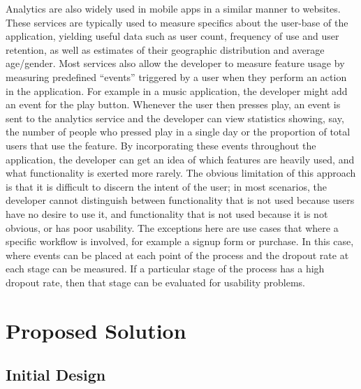 Analytics are also widely used in mobile apps in a similar manner to websites.
These services are typically used to measure specifics about the user-base of
the application, yielding useful data such as user count, frequency of use and
user retention, as well as estimates of their geographic distribution and
average age/gender. Most services also allow the developer to measure feature
usage by measuring predefined ``events'' triggered by a user when they perform
an action in the application. For example in a music application, the developer
might add an event for the play button. Whenever the user then presses play, an
event is sent to the analytics service and the developer can view statistics
showing, say, the number of people who pressed play in a single day or the
proportion of total users that use the feature. By incorporating these events
throughout the application, the developer can get an idea of which features are
heavily used, and what functionality is exerted more rarely. The obvious
limitation of this approach is that it is difficult to discern the intent of
the user; in most scenarios, the developer cannot distinguish between
functionality that is not used because users have no desire to use it, and
functionality that is not used because it is not obvious, or has poor
usability. The exceptions here are use cases that where a specific workflow is
involved, for example a signup form or purchase. In this case, where events can
be placed at each point of the process and the dropout rate at each stage can
be measured. If a particular stage of the process has a high dropout rate, then
that stage can be evaluated for usability problems.

\section{Proposed Solution}

\subsection{Initial Design}

